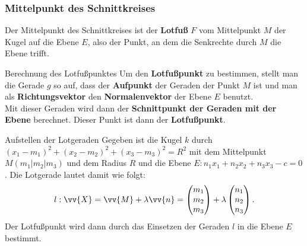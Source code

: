 \subsubsection*{Mittelpunkt des Schnittkreises}
Der Mittelpunkt des Schnittkreises ist der \textbf{Lotfuß} \(F\) vom Mittelpunkt \(M\) der Kugel auf die Ebene \(E\),
also der Punkt, an dem die Senkrechte durch \(M\) die Ebene trifft.
\begin{merke}{Berechnung des Lotfußpunktes}{}
 Um den \textbf{Lotfußpunkt} zu bestimmen, stellt man die Gerade \(g\) so auf, dass der \textbf{Aufpunkt} der Geraden der Punkt \(M\) ist und man als \textbf{Richtungsvektor} den \textbf{Normalenvektor} der Ebene \(E\) benutzt. \\
 Mit dieser Geraden wird dann der \textbf{Schnittpunkt der Geraden mit der Ebene} berechnet. Dieser Punkt ist dann der \textbf{Lotfußpunkt}.
\end{merke}
\begin{bem}{Aufstellen der Lotgeraden}{}
    Gegeben ist die Kugel \(k\) durch \(\left(x_1-m_1\right)^2 + \left(x_2-m_2\right)^2 + \left(x_3-m_3\right)^2 = R^2\) mit dem Mittelpunkt \(M(m_1|m_2|m_3)\) und dem Radius \(R\) und die Ebene \(E: n_1x_1 +n_2x_2+n_3x_3-c=0\). Die Lotgerade lautet damit wie folgt: \[l:\vv{X} = \vv{M} + \lambda \vv{n} = \begin{pmatrix}
        m_1\\m_2\\m_3
    \end{pmatrix} + \lambda \begin{pmatrix}
        n_1\\n_2\\n_3
    \end{pmatrix}.\]
    Der Lotfußpunkt wird dann durch das Einsetzen der Geraden \(l\) in die Ebene \(E\) bestimmt.
\end{bem}

